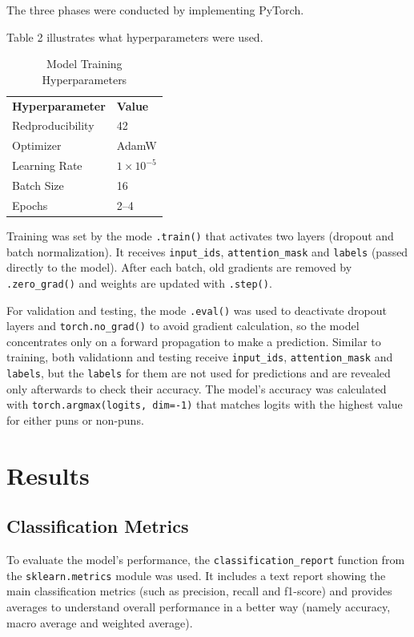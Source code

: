 \documentclass[11pt,a4paper]{article}
\begin{document}
The three phases were conducted by implementing PyTorch. 

Table 2 illustrates what hyperparameters were used.

\begin{table}[h]
\centering
\begin{tabular}{|ll|}
\hline
\small %
\setlength{\tabcolsep}{4pt} %
\textbf{Hyperparameter} & \textbf{Value} \\ 
Redproducibility       & 42 \\ 
Optimizer              & AdamW \\ 
Learning Rate          & $1 \times 10^{-5}$ \\ 
Batch Size             & 16 \\ 
Epochs                 & 2--4 \\ \hline
\end{tabular}
\caption{Model Training Hyperparameters}
\label{tab:hyperparameters}
\end{table}

Training was set by the mode \texttt{.train()} that activates two layers (dropout and batch normalization). It receives  \texttt{input\_ids},  \texttt{attention\_mask} and  \texttt{labels} (passed directly to the model). After each batch, old gradients are removed by \texttt{.zero\_grad()} and weights are updated with \texttt{.step()}.


For validation and testing, the mode \texttt{.eval()} was used to deactivate dropout layers and \texttt{torch.no\_grad()} to avoid gradient calculation, so the model concentrates only on a forward propagation to make a prediction. Similar to training, both validationn and testing  receive \texttt{input\_ids},  \texttt{attention\_mask} and  \texttt{labels}, but the \texttt{labels} for them are not used for predictions and are revealed only afterwards to check their accuracy. The model's accuracy was calculated with \texttt{torch.argmax(logits, dim=-1)} that matches logits with the highest value for either puns or non-puns. 


\section{Results}
\subsection{Classification Metrics}

To evaluate the model's performance, the \texttt{classification\_report} function from the \texttt{sklearn.metrics} module was used. It includes a text report showing the main classification metrics (such as precision, recall and f1-score) and provides averages to understand overall performance in a better way (namely accuracy, macro average and weighted average).
\end{document}
